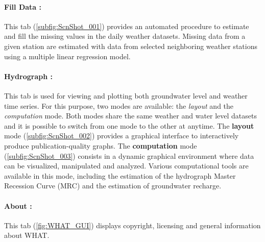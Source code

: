 \documentclass[WHATMANUAL.tex]{subfiles}
\begin{document}
\paragraph{Fill Data :} This tab (\cref{subfig:ScnShot_001}) provides an automated procedure to estimate and fill the missing values in the daily weather datasets. Missing data from a given station are estimated with data from selected neighboring weather stations using a multiple linear regression model.

\paragraph{Hydrograph :} This tab is used for viewing and plotting both groundwater level and weather time series. For this purpose, two modes are available: the \emph{layout} and the \emph{computation} mode. Both modes share the same weather and water level datasets and it is possible to switch from one mode to the other at anytime. The \textbf{layout} mode (\cref{subfig:ScnShot_002}) provides a graphical interface to interactively produce publication-quality graphs. The \textbf{computation} mode (\cref{subfig:ScnShot_003}) consists in a dynamic graphical environment where data can be visualized, manipulated and analyzed. Various computational tools are available in this mode, including the estimation of the hydrograph Master Recession Curve (MRC) and the estimation of groundwater recharge.

\paragraph{About :} This tab (\cref{fig:WHAT_GUI}) displays copyright, licensing and general information about WHAT.
\end{document}
